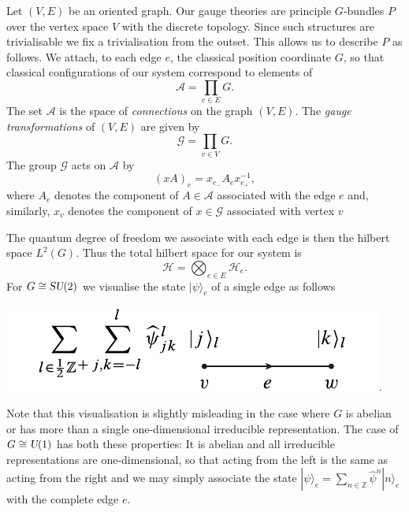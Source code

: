 \documentclass[12pt]{amsart}
\def\su2{\textsl{SU}(2)}
\def\uone{\textsl{U}(1)}
\theoremstyle{definition}
\theoremstyle{remark}
\numberwithin{equation}{section}
\begin{document}
Let $(V,E)$ be an oriented graph. Our gauge theories are principle $G$-bundles $P$ over the vertex space $V$ with the discrete topology. Since such structures are trivialisable we fix a trivialisation from the outset. This allows us to describe $P$ as follows. We attach, to each edge $e$, the classical position coordinate $G$, so that classical configurations of our system correspond to elements of
\begin{equation}
	\mathcal{A} = \prod_{e\in E} G.
\end{equation}
The set $\mathcal{A}$ is the space of \emph{connections} on the graph $(V,E)$. The \emph{gauge transformations} of $(V,E)$ are given by
\begin{equation}
	\mathcal{G} = \prod_{v\in V} G.
\end{equation}
The group $\mathcal{G}$ acts on $\mathcal{A}$ by
\begin{equation}
	(xA)_e = x_{e_-} A_e x_{e_+}^{-1},
\end{equation}
where $A_e$ denotes the component of $A \in \mathcal{A}$ associated with the edge $e$ and, similarly, $x_v$ denotes the component of $x\in \mathcal{G}$ associated with vertex $v$ 


The quantum degree of freedom we associate with each edge is then the hilbert space $L^2(G)$. Thus the total hilbert space for our system is
\begin{equation}
	\mathcal{H} = \bigotimes_{e\in E} \mathcal{H}_e.
\end{equation}
For $G \cong \su2$ we visualise the state $|\psi\rangle_e$ of a single edge as follows
\begin{center}
	\includegraphics{edgespace.pdf}.
\end{center}
Note that this visualisation is slightly misleading in the case where $G$ is 
abelian or has more than a single one-dimensional irreducible representation.
The case of $G \cong \uone$ has both these properties: It is abelian and all
irreducible representations are one-dimensional, so that 
acting from the left is the same as acting from the right and we 
may simply associate the state 
$|\psi\rangle_e = \sum_{n\in \mathbb{Z}} \widehat{\psi}^n |n\rangle_e$
with the complete edge $e$.
\end{document}

